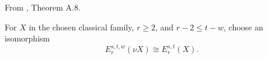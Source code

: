 \begin{definition}
\label{frontier:Literature:c8c44dc9bb6c}
From \cite{BHS}, Theorem A.8.\par

For $X$ in the chosen classical family, $r\ge2$, and $r-2\le t-w$, choose an isomorphism\[E_r^{s,t,w}(\nu X)\cong E_r^{s,t}(X).\]
\end{definition}



